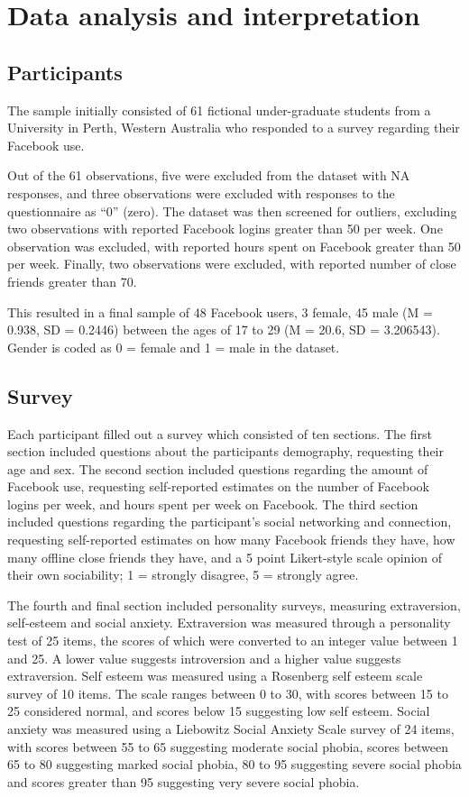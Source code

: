 \section{Data analysis and interpretation}

\subsection{Participants}

The sample initially consisted of 61 fictional under-graduate students from a University in Perth, Western Australia who responded to a survey regarding their Facebook use. 

Out of the 61 observations, five were excluded from the dataset with NA responses, and three observations were excluded with responses to the questionnaire as ``0'' (zero). The dataset was then screened for outliers, excluding two observations with reported Facebook logins greater than 50 per week. One observation was excluded, with reported hours spent on Facebook greater than 50 per week. Finally, two observations were excluded, with reported number of close friends greater than 70.

This resulted in a final sample of 48 Facebook users, 3 female, 45 male (M = 0.938, SD = 0.2446) between the ages of 17 to 29 (M = 20.6, SD = 3.206543). Gender is coded as 0 = female and 1 = male in the dataset.

\subsection{Survey}

Each participant filled out a survey which consisted of ten sections. The first section included questions about the participants demography, requesting their age and sex. The second section included questions regarding the amount of Facebook use, requesting self-reported estimates on the number of Facebook logins per week, and hours spent per week on Facebook. The third section included questions regarding the participant's social networking and connection, requesting self-reported estimates on how many Facebook friends they have, how many offline close friends they have, and a 5 point Likert-style scale opinion of their own sociability; 1 = strongly disagree, 5 = strongly agree. 

The fourth and final section included personality surveys, measuring extraversion, self-esteem and social anxiety. Extraversion was measured through a personality test of 25 items, the scores of which were converted to an integer value between 1 and 25. A lower value suggests introversion and a higher value suggests extraversion. Self esteem was measured using a Rosenberg self esteem scale survey of 10 items. The scale ranges between 0 to 30, with scores between 15 to 25 considered normal, and scores below 15 suggesting low self esteem. Social anxiety was measured using a Liebowitz Social Anxiety Scale survey of 24 items, with scores between 55 to 65 suggesting moderate social phobia, scores between 65 to 80 suggesting marked social phobia, 80 to 95 suggesting severe social phobia and scores greater than 95 suggesting very severe social phobia.

